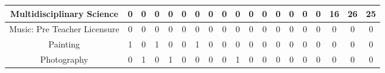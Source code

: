 \documentclass[10]{article}
\begin{document}
\begin{landscape}
\begin{longtable}[c]{|ccccccccccccccccccc|}
	\multicolumn{1}{|c|}{Multidisciplinary Science}                  & \multicolumn{1}{c|}{0}          & \multicolumn{1}{c|}{0}          & \multicolumn{1}{c|}{0}          & \multicolumn{1}{c|}{0}          & \multicolumn{1}{c|}{0}          & \multicolumn{1}{c|}{0}          & \multicolumn{1}{c|}{0}          & \multicolumn{1}{c|}{0}          & \multicolumn{1}{c|}{0}          & \multicolumn{1}{c|}{0}          & \multicolumn{1}{c|}{0}          & \multicolumn{1}{c|}{0}          & \multicolumn{1}{c|}{0}          & \multicolumn{1}{c|}{0}          & \multicolumn{1}{c|}{0}          & \multicolumn{1}{c|}{16}         & \multicolumn{1}{c|}{26}         & 25         \\ \hline
	\multicolumn{1}{|c|}{Music: Pre Teacher Licensure}               & \multicolumn{1}{c|}{0}          & \multicolumn{1}{c|}{0}          & \multicolumn{1}{c|}{0}          & \multicolumn{1}{c|}{0}          & \multicolumn{1}{c|}{0}          & \multicolumn{1}{c|}{0}          & \multicolumn{1}{c|}{0}          & \multicolumn{1}{c|}{0}          & \multicolumn{1}{c|}{0}          & \multicolumn{1}{c|}{0}          & \multicolumn{1}{c|}{0}          & \multicolumn{1}{c|}{0}          & \multicolumn{1}{c|}{0}          & \multicolumn{1}{c|}{0}          & \multicolumn{1}{c|}{0}          & \multicolumn{1}{c|}{0}          & \multicolumn{1}{c|}{0}          & 0          \\ \hline
	\multicolumn{1}{|c|}{Painting}                                   & \multicolumn{1}{c|}{1}          & \multicolumn{1}{c|}{0}          & \multicolumn{1}{c|}{1}          & \multicolumn{1}{c|}{0}          & \multicolumn{1}{c|}{0}          & \multicolumn{1}{c|}{1}          & \multicolumn{1}{c|}{0}          & \multicolumn{1}{c|}{0}          & \multicolumn{1}{c|}{0}          & \multicolumn{1}{c|}{0}          & \multicolumn{1}{c|}{0}          & \multicolumn{1}{c|}{0}          & \multicolumn{1}{c|}{0}          & \multicolumn{1}{c|}{0}          & \multicolumn{1}{c|}{0}          & \multicolumn{1}{c|}{0}          & \multicolumn{1}{c|}{0}          & 0          \\ \hline
	\multicolumn{1}{|c|}{Photography}                                & \multicolumn{1}{c|}{0}          & \multicolumn{1}{c|}{1}          & \multicolumn{1}{c|}{0}          & \multicolumn{1}{c|}{1}          & \multicolumn{1}{c|}{0}          & \multicolumn{1}{c|}{0}          & \multicolumn{1}{c|}{0}          & \multicolumn{1}{c|}{0}          & \multicolumn{1}{c|}{1}          & \multicolumn{1}{c|}{0}          & \multicolumn{1}{c|}{0}          & \multicolumn{1}{c|}{0}          & \multicolumn{1}{c|}{0}          & \multicolumn{1}{c|}{0}          & \multicolumn{1}{c|}{0}          & \multicolumn{1}{c|}{0}          & \multicolumn{1}{c|}{0}          & 0          \\ \hline

\end{longtable}
\end{landscape}
\end{document}

